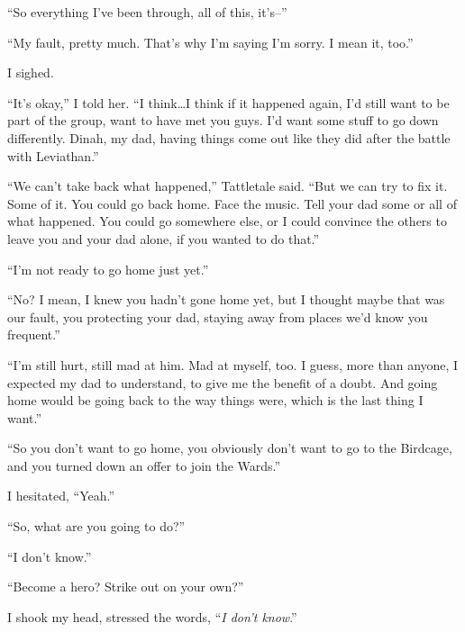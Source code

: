 ``So everything I've been through, all of this, it's--''



``My fault, pretty much.  That's why I'm saying I'm sorry.  I mean it, too.''



I sighed.



``It's okay,'' I told her.  ``I think\ldots I think if it happened again, I'd still want to be part of the group, want to have met you guys.  I'd want some stuff to go down differently.  Dinah, my dad, having things come out like they did after the battle with Leviathan.''



``We can't take back what happened,'' Tattletale said.  ``But we can try to fix it.  Some of it.  You could go back home.  Face the music.  Tell your dad some or all of what happened.  You could go somewhere else, or I could convince the others to leave you and your dad alone, if you wanted to do that.''



``I'm not ready to go home just yet.''



``No?  I mean, I knew you hadn't gone home yet, but I thought maybe that was our fault, you protecting your dad, staying away from places we'd know you frequent.''



``I'm still hurt, still mad at him.  Mad at myself, too.  I guess, more than anyone, I expected my dad to understand, to give me the benefit of a doubt.  And going home would be going back to the way things were, which is the last thing I want.''



``So you don't want to go home, you obviously don't want to go to the Birdcage, and you turned down an offer to join the Wards.''



I hesitated, ``Yeah.''



``So, what are you going to do?''



``I don't know.''



``Become a hero?  Strike out on your own?''



I shook my head, stressed the words, ``\emph{I don't know}.''



